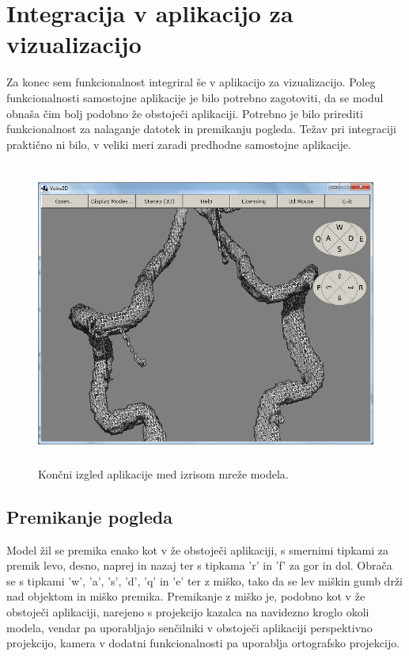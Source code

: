 \documentclass[a4paper, 12pt]{book}
\begin{document}
\section{Integracija v aplikacijo za vizualizacijo}

Za konec sem funkcionalnost integriral še v aplikacijo za vizualizacijo. Poleg funkcionalnosti samostojne aplikacije je bilo potrebno zagotoviti, da se modul obnaša čim bolj podobno že obstoječi aplikaciji. Potrebno je bilo prirediti funkcionalnost za nalaganje datotek in premikanju pogleda. Težav pri integraciji praktično ni bilo, v veliki meri zaradi predhodne samostojne aplikacije.

\begin{figure}[h!]
\begin{center}
\includegraphics[width=\textwidth, height=10cm, keepaspectratio=true]{koncna_implementacija.png}
\end{center}
\caption{Končni izgled aplikacije med izrisom mreže modela.}
\label{renderingartifact}
\end{figure}

\subsection{Premikanje pogleda}

Model žil se premika enako kot v že obstoječi aplikaciji, s smernimi tipkami za premik levo, desno, naprej in nazaj ter s tipkama 'r' in 'f' za gor in dol. Obrača se s tipkami 'w', 'a', 's', 'd', 'q' in 'e' ter z miško, tako da se lev miškin gumb drži nad objektom in miško premika. Premikanje z miško je, podobno kot v že obstoječi aplikaciji, narejeno s projekcijo kazalca na navidezno kroglo okoli modela, vendar pa uporabljajo senčilniki v obstoječi aplikaciji perspektivno projekcijo, kamera v dodatni funkcionalnosti pa uporablja ortografsko projekcijo.
\end{document}
